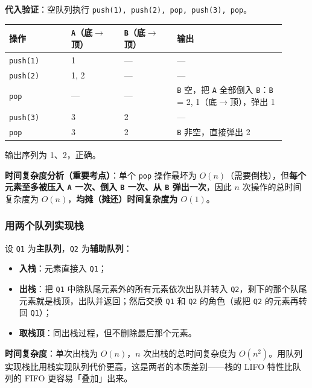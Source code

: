 \documentclass[11pt,openany,UTF8]{ctexbook}
\begin{document}
\textbf{代入验证}：空队列执行 \texttt{push(1)\allowbreak{},\allowbreak{} push(2)\allowbreak{},\allowbreak{} pop,\allowbreak{} push(3)\allowbreak{},\allowbreak{} pop}。

\begingroup\small\setlength{\tabcolsep}{4.0pt}
\begin{longtable}{@{}L{0.2098\linewidth}L{0.1736\linewidth}L{0.1736\linewidth}L{0.3544\linewidth}@{}}
\toprule
\textbf{操作} & \textbf{\texttt{A}（底$\to$顶）} & \textbf{\texttt{B}（底$\to$顶）} & \textbf{输出} \\
\midrule
\endhead
\texttt{push(1)\allowbreak{}} & 1 & — & — \\
\texttt{push(2)\allowbreak{}} & 1, 2 & — & — \\
\texttt{pop} & — & — & \texttt{B} 空，把 \texttt{A} 全部倒入 \texttt{B}：\texttt{B} = 2, 1（底$\to$顶），弹出 1 \\
\texttt{push(3)\allowbreak{}} & 3 & 2 & — \\
\texttt{pop} & 3 & 2 & \texttt{B} 非空，直接弹出 2 \\
\bottomrule
\end{longtable}
\endgroup

输出序列为 1、2，正确。

\textbf{时间复杂度分析（重要考点）}：单个 \texttt{pop} 操作最坏为 $O(n)$（需要倒栈），但\textbf{每个元素至多被压入 \texttt{A} 一次、倒入 \texttt{B} 一次、从 \texttt{B} 弹出一次}，因此 $n$ 次操作的总时间复杂度为 $O(n)$，\textbf{均摊（摊还）时间复杂度为 $O(1)$}。

\subsubsection{用两个队列实现栈}

设 \texttt{Q1} 为\textbf{主队列}，\texttt{Q2} 为\textbf{辅助队列}：

\begin{itemize}
\item \textbf{入栈}：元素直接入 \texttt{Q1}；
\item \textbf{出栈}：把 \texttt{Q1} 中除队尾元素外的所有元素依次出队并转入 \texttt{Q2}，剩下的那个队尾元素就是栈顶，出队并返回；然后交换 \texttt{Q1} 和 \texttt{Q2} 的角色（或把 \texttt{Q2} 的元素再转回 \texttt{Q1}）；
\item \textbf{取栈顶}：同出栈过程，但不删除最后那个元素。
\end{itemize}
\textbf{时间复杂度}：单次出栈为 $O(n)$，$n$ 次出栈的总时间复杂度为 $O(n^2)$。用队列实现栈比用栈实现队列代价更高，这是两者的本质差别——栈的 LIFO 特性比队列的 FIFO 更容易「叠加」出来。
\end{document}
